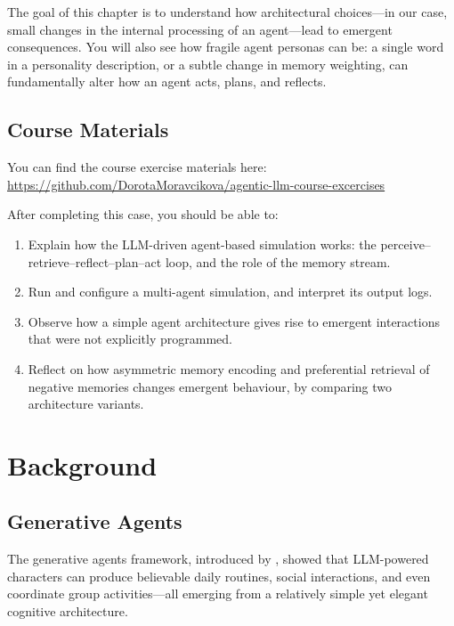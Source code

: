 
The goal of this chapter is to understand how architectural choices---in our case, small changes in the internal processing of an agent---lead to emergent consequences. You will also see how fragile agent personas can be: a single word in a personality description, or a subtle change in memory weighting, can fundamentally alter how an agent acts, plans, and reflects.

\subsection*{Course Materials}
You can find the course exercise materials here: \url{https://github.com/DorotaMoravcikova/agentic-llm-course-excercises}


After completing this case, you should be able to:

\begin{enumerate}
    \item Explain how the LLM-driven agent-based simulation works: the perceive--retrieve--reflect--plan--act loop, and the role of the memory stream.
    \item Run and configure a multi-agent simulation, and interpret its output logs.
    \item Observe how a simple agent architecture gives rise to emergent interactions that were not explicitly programmed.
    \item Reflect on how asymmetric memory encoding and preferential retrieval of negative memories changes emergent behaviour, by comparing two architecture variants.
\end{enumerate}


\section{Background}

\subsection{Generative Agents}

The generative agents framework, introduced by \citet{park2023generative}, showed that LLM-powered characters can produce believable daily routines, social interactions, and even coordinate group activities---all emerging from a relatively simple yet elegant cognitive architecture.

